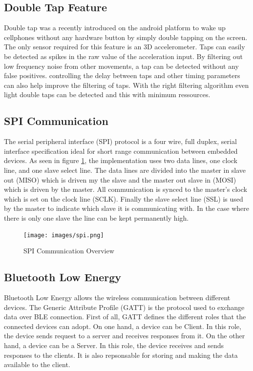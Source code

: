 \documentclass[12pt]{article}
\begin{document}
\subsection{Double Tap Feature}
Double tap was a recently introduced on the android platform to wake up cellphones without any hardware button by simply double tapping on the screen. The only sensor required for this feature is an 3D accelerometer. Taps can easily be detected as spikes in the raw value of the acceleration input. By filtering out low frequency noise from other movements, a tap can be detected without any false positives. controlling the delay between taps and other timing parameters can also help improve the filtering of taps. With the right filtering algorithm even light double taps can be detected and this with minimum ressources. 
\subsection{SPI Communication}
The serial peripheral interface (SPI) protocol is a four wire, full duplex, serial interface specification ideal for short range communication between embedded devices. As seen in figure \ref{fig:spi}, the implementation uses two data lines, one clock line, and one slave select line. The data lines are divided into the master in slave out (MISO) which is driven my the slave and the master out slave in (MOSI) which is driven by the master. All communication is synced to the master's clock which is set on the clock line (SCLK). Finally the slave select line (SSL) is used by the master to indicate which slave it is communicating with. In the case where there is only one slave the line can be kept permanently high.

\begin{figure}[!htb]
  \centering
  \texttt{[image: images/spi.png]}
  \caption{SPI Communication Overview}
  \label{fig:spi}
 \end{figure}

\subsection{Bluetooth Low Energy}
Bluetooth Low Energy allows the wireless communication between different devices. The Generic Attribute Profile (GATT) is the protocol used to exchange data over BLE connection. First of all, GATT defines the different roles that the connected devices can adopt. On one hand, a device can be Client. In this role, the device sends request to a server and receives responses from it. On the other hand, a device can be a Server. In this role, the device receives and sends responses to the clients. It is also repsonsable for storing and making the data available to the client.
\end{document}
